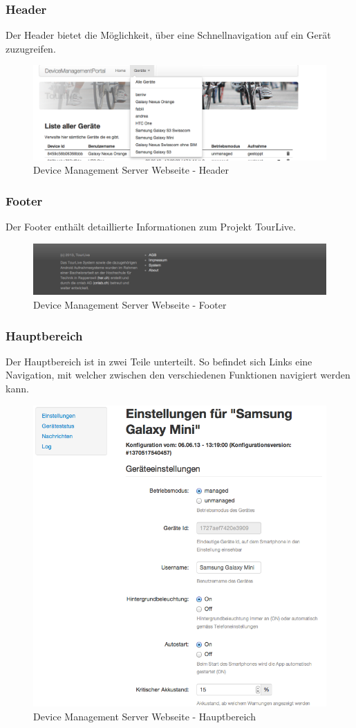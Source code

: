 \subsubsection{Header}
Der Header bietet die Möglichkeit, über eine Schnellnavigation auf ein Gerät zuzugreifen. 
\begin{figure}[H]
	\centering
	\includegraphics[width=120mm]{images/devmgmtsrv/header.png}
	\caption{Device Management Server Webseite - Header}
\end{figure}



\pagebreak
\subsubsection{Footer}
Der Footer enthält detaillierte Informationen zum Projekt TourLive. 
 
\begin{figure}[H]
	\centering
	\includegraphics[width=120mm]{images/devmgmtsrv/footer.png}
	\caption{Device Management Server Webseite - Footer}
\end{figure}


\subsubsection{Hauptbereich}
Der Hauptbereich ist in zwei Teile unterteilt. So befindet sich Links eine Navigation, mit welcher zwischen den verschiedenen Funktionen navigiert werden kann. 
 
\begin{figure}[H]
	\centering
	\includegraphics[width=120mm]{images/devmgmtsrv/settings.png}
	\caption{Device Management Server Webseite - Hauptbereich}
\end{figure}

